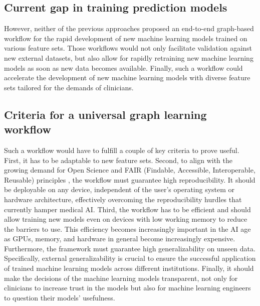 \documentclass[pdflatex,sn-mathphys-num,lineno]{sn-jnl}
\theoremstyle{thmstyleone}%
\theoremstyle{thmstyletwo}%
\theoremstyle{thmstylethree}%
\begin{document}
\subsection{Current gap in training prediction models}
However, neither of the previous approaches proposed an end-to-end graph-based workflow for the rapid development of new machine learning models trained on various feature sets. Those workflows would not only facilitate validation against new external datasets, but also allow for rapidly retraining new machine learning models as soon as new data becomes available. Finally, such a workflow could accelerate the development of new machine learning models with diverse feature sets tailored for the demands of clinicians. 

\subsection{Criteria for a universal graph learning workflow}
Such a workflow would have to fulfill a couple of key criteria to prove useful. First, it has to be adaptable to new feature sets. Second, to align with the growing demand for Open Science and FAIR (Findable, Accessible, Interoperable, Reusable) principles \cite{Wilkinson2016}, the workflow must guarantee high reproducibility. It should be deployable on any device, independent of the user's operating system or hardware architecture, effectively overcoming the reproducibility hurdles that currently hamper medical AI. Third, the workflow has to be efficient and should allow training new models even on devices with low working memory to reduce the barriers to use. This efficiency becomes increasingly important in the AI age as GPUs, memory, and hardware in general become increasingly expensive. Furthermore, the framework must guarantee high generalizability on unseen data. Specifically, external generalizability is crucial to ensure the successful application of trained machine learning models across different institutions. Finally, it should make the decisions of the machine learning models transparent, not only for clinicians to increase trust in the models but also for machine learning engineers to question their models' usefulness. 
\end{document}
